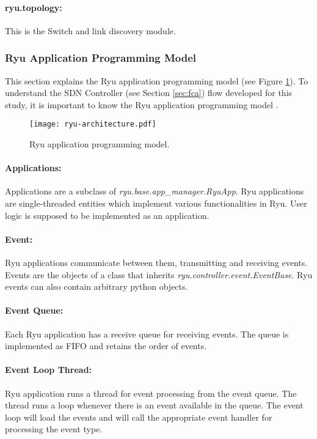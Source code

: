 \paragraph{ryu.topology:}
This is the Switch and link discovery module.

\subsubsection{Ryu Application Programming Model}
This section explains the Ryu application programming model (see Figure \ref{fig:ryuarch}). To understand the SDN Controller (see Section \ref{sec:fca}) flow developed for this study, it is important to know the Ryu application programming model \cite{ryuapm}.

\begin{figure}[H]
	\begin{center}
		\resizebox{\textwidth}{!}
		{\texttt{[image: ryu-architecture.pdf]}}
		\caption{Ryu application programming model.}
		\label{fig:ryuarch}
	\end{center}
\end{figure}

\paragraph{Applications:}
Applications are a subclass of \textit{ryu.base.app\_manager.RyuApp}. Ryu applications are single-threaded entities which implement various functionalities in Ryu. User logic is supposed to be implemented as an application.
\paragraph{Event:}
Ryu applications communicate between them, transmitting and receiving events. Events are the objects of a class that inherits \textit{ryu.controller.event.EventBase}. Ryu events can also contain arbitrary python objects.
\paragraph{Event Queue:}
Each Ryu application has a receive queue for receiving events. The queue is implemented as FIFO and retains the order of events.
\paragraph{Event Loop Thread:}
Ryu application runs a thread for event processing from the event queue. The thread runs a loop whenever there is an event available in the queue. The event loop will load the events and will call the appropriate event handler for processing the event type.
